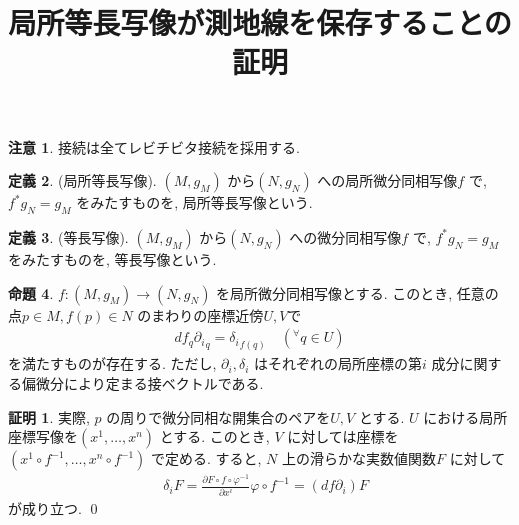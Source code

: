 \documentclass[10pt, fleqn, label-section=none]{bxjsarticle}
\title{局所等長写像が測地線を保存することの証明}
\author{}
\date{}
\theoremstyle{definition}
\newtheorem{dfn}{定義}[section]
\newtheorem{prop}[dfn]{命題}
\newtheorem*{pf*}{証明}
\newtheorem{remark}[dfn]{注意}
\newcommand{\any}{{}^{\forall}}
\begin{document}
\maketitle
\scriptsize 



\section{}

\begin{remark}
接続は全てレビチビタ接続を採用する. 
\end{remark}


\begin{dfn}(局所等長写像).
$(M,g_M)$ から$(N, g_N)$ への局所微分同相写像$f$ で, $f^* g_N = g_M$ をみたすものを, 局所等長写像という.
\end{dfn}

\begin{dfn}(等長写像).
$(M,g_M)$ から$(N, g_N)$ への微分同相写像$f$ で, $f^* g_N = g_M$ をみたすものを, 等長写像という.
\end{dfn}


\begin{prop}
$f: (M,g_M) \rightarrow (N,g_N)$ を局所微分同相写像とする. このとき, 任意の点$p \in M, f(p) \in N$ のまわりの座標近傍$U, V$で
\begin{align*} df_q {\partial_i} _q  = {\delta_i }_{f(q) }  \quad (\any q \in U)\end{align*}
を満たすものが存在する. ただし, $\partial_i, \delta_i$ はそれぞれの局所座標の第$i$ 成分に関する偏微分により定まる接ベクトルである. 
\end{prop}
\begin{pf*}
実際, $p$ の周りで微分同相な開集合のペアを$U, V$ とする. $U $ における局所座標写像を$(x^1, \ldots, x^n)$ とする. このとき, $V$ に対しては座標を$(x^1 \circ f^{-1}, \ldots, x^n \circ f^{-1})$ で定める. すると, $N$ 上の滑らかな実数値関数$F$ に対して
\begin{align*} & \delta_i F = \frac{\partial F \circ f \circ \varphi^{-1} }{ \partial x^i} \varphi \circ f^{-1} = (df \partial_i ) F   \end{align*}
が成り立つ. 
\qed
\end{pf*}
\end{document}
